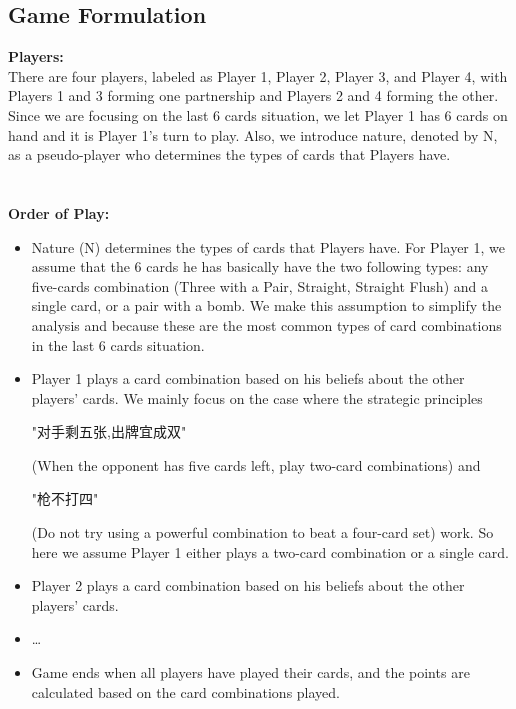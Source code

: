 \documentclass{article}
\begin{document}
\subsection{Game Formulation}
\textbf{Players:}\\
There are four players, labeled as Player 1, Player 2, Player 3, and Player 4, with Players 1 and 3 forming one partnership and Players 2 and 4 forming the other. Since we are focusing on the last 6 cards situation, we let Player 1 has 6 cards on hand and it is Player 1's turn to play. Also, we introduce nature, denoted by N, as a pseudo-player who determines the types of cards that Players have.\\
\\ \hspace*{\fill} \\
\textbf{Order of Play:}\\
\begin{itemize}
    \item Nature (N) determines the types of cards that Players have. For Player 1, we assume that the 6 cards he has basically have the two following types:  
    any five-cards combination (Three with a Pair, Straight, Straight Flush) and a single card, or a pair with a bomb. We make this assumption to simplify the analysis and because these are the most common types of card combinations in the last 6 cards situation.\\
    \item Player 1 plays a card combination based on his beliefs about the other players' cards. We mainly focus on the case where the strategic principles 
    \begin{CJK*}{UTF8}{gbsn}"对手剩五张,出牌宜成双" \end{CJK*}
    (When the opponent has five cards left, play two-card combinations) and 
    \begin{CJK*}{UTF8}{gbsn}"枪不打四"  \end{CJK*}
    (Do not try using a powerful combination to beat a four-card set) work. So here we assume Player 1 either plays a two-card combination or a single card.
    \item Player 2 plays a card combination based on his beliefs about the other players' cards.
    \item \dots
    \item Game ends when all players have played their cards, and the points are calculated based on the card combinations played.
\end{itemize}
\\ \hspace*{\fill} \\
\end{document}
